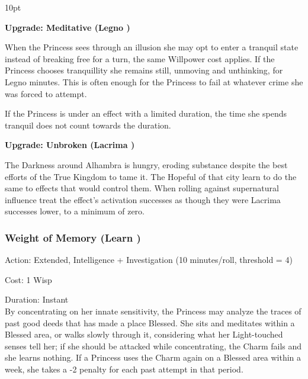 \begin{myindentpar}{10pt}

\textbf{Upgrade: Meditative (Legno \textbullet\textbullet\textbullet)}

When the Princess sees through an illusion she may opt to enter a tranquil state instead of breaking free for a turn, the same Willpower cost applies. If the Princess chooses tranquillity she remains still, unmoving and unthinking, for Legno minutes. This is often enough for the Princess to fail at whatever crime she was forced to attempt. 

If the Princess is under an effect with a limited duration, the time she spends tranquil does not count towards the duration.

\textbf{Upgrade: Unbroken (Lacrima \textbullet\textbullet\textbullet\textbullet)}

The Darkness around Alhambra is hungry, eroding substance despite the best efforts of the True Kingdom to tame it. The Hopeful of that city learn to do the same to effects that would control them. When rolling against supernatural influence treat the effect's activation successes as though they were Lacrima successes lower, to a minimum of zero.\end{myindentpar}

\subsubsection*{Weight of Memory (Learn \textbullet\textbullet)}

\noindent Action: Extended, Intelligence + Investigation (10 minutes/roll, threshold = 4) 

\noindent Cost: 1 Wisp 

\noindent Duration: Instant \\

By concentrating on her innate sensitivity, the Princess may analyze the traces of past good deeds that has made a place Blessed. She sits and meditates within a Blessed area, or walks slowly through it, considering what her Light-touched senses tell her; if she should be attacked while concentrating, the Charm fails and she learns nothing. If a Princess uses the Charm again on a Blessed area within a week, she takes a -2 penalty for each past attempt in that period. 


